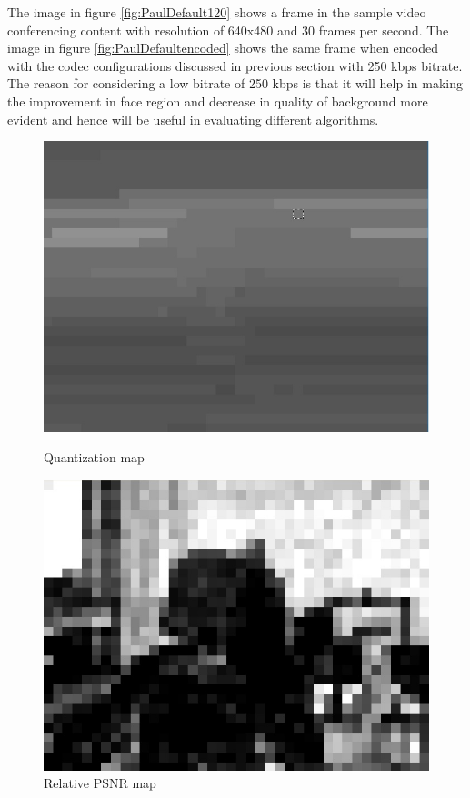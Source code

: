 \documentclass[11pt]{article} %
\begin{document}
The image in figure \ref{fig:PaulDefault120} shows a frame in the sample video conferencing content with resolution of 640x480 and 30 frames per second. The image in figure \ref{fig:PaulDefaultencoded} shows the same frame when encoded with the codec configurations discussed in previous section with 250 kbps bitrate. The reason for considering a low bitrate of 250 kbps is that it will help in making the improvement in face region and decrease in quality of background more evident and hence will be useful in evaluating different algorithms. 

\begin{figure}[!h]
    \centering
    \includegraphics[scale=0.5]{PaulDefault120_91250kbps_quant}
    \caption{Quantization map}
    \label{fig:PaulDefault120Quant}
    \includegraphics[scale=0.5]{PaulDefault120_91250kbps_psnr}
    \caption{Relative PSNR map}
    \label{fig:PaulDefault120PSNR}
\end{figure} 
\end{document}
